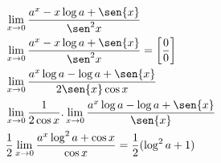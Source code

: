 \begin{ex}
\begin{align}
&\lim_{x\rightarrow 0} \frac{a^{x}-x\log{a}+\sen{x}}{\sen^2{x}}\nonumber\\
&\lim_{x\rightarrow 0} \frac{a^{x}-x\log{a}+\sen{x}}{\sen^2{x}}=\left[\frac{0}{0}\right]\nonumber\\
&\lim_{x\rightarrow 0} \frac{a^{x}\log{a}-\log{a}+\sen{x}}{2\sen{x}\cos{x}}\nonumber\\
&\lim_{x\rightarrow 0} \frac{1}{2\cos{x}}.\lim_{x\rightarrow 0} \frac{a^{x}\log{a}-\log{a}+\sen{x}}{\sen{x}}\nonumber\\
&\frac{1}{2}\lim_{x\rightarrow 0} \frac{a^{x}\log^2{a}+\cos{x}}{\cos{x}}=\frac{1}{2}(\log^2{a}+1)\nonumber
\end{align}
\end{ex}
